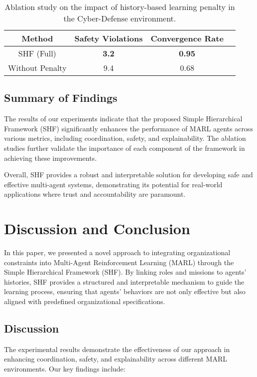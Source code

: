 \documentclass[sigconf,anonymous]{aamas}
\begin{document}
\begin{table}[ht]
\centering
\caption{Ablation study on the impact of history-based learning penalty in the Cyber-Defense environment.}
\label{table:history_penalty_ablation}
\begin{tabular}{|c|c|c|c|}
\hline
\textbf{Method} & \textbf{Safety Violations} & \textbf{Convergence Rate} \\ \hline
SHF (Full) & \textbf{3.2} & \textbf{0.95} \\ \hline
Without Penalty & 9.4 & 0.68 \\ \hline
\end{tabular}
\end{table}

\subsection{Summary of Findings}
The results of our experiments indicate that the proposed Simple Hierarchical Framework (SHF) significantly enhances the performance of MARL agents across various metrics, including coordination, safety, and explainability. The ablation studies further validate the importance of each component of the framework in achieving these improvements.

Overall, SHF provides a robust and interpretable solution for developing safe and effective multi-agent systems, demonstrating its potential for real-world applications where trust and accountability are paramount.



\section{Discussion and Conclusion}
\label{sec:discussion_conclusion}

In this paper, we presented a novel approach to integrating organizational constraints into Multi-Agent Reinforcement Learning (MARL) through the Simple Hierarchical Framework (SHF). By linking roles and missions to agents' histories, SHF provides a structured and interpretable mechanism to guide the learning process, ensuring that agents' behaviors are not only effective but also aligned with predefined organizational specifications.

\subsection{Discussion}
The experimental results demonstrate the effectiveness of our approach in enhancing coordination, safety, and explainability across different MARL environments. Our key findings include:
\end{document}
